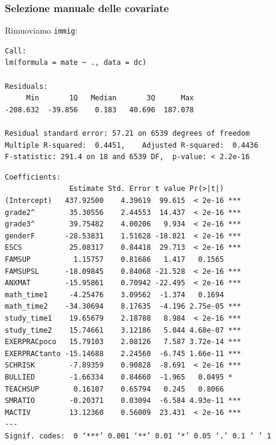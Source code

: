 \documentclass{beamer}
\begin{document}


\begin{frame}[fragile]

\frametitle{Selezione manuale delle covariate}
Rimuoviamo \texttt{immig}:
{\scriptsize
\begin{verbatim}
Call:
lm(formula = mate ~ ., data = dc)

Residuals:
     Min       1Q   Median       3Q      Max 
-208.632  -39.856    0.183   40.696  187.078 

Residual standard error: 57.21 on 6539 degrees of freedom
Multiple R-squared:  0.4451,	Adjusted R-squared:  0.4436 
F-statistic: 291.4 on 18 and 6539 DF,  p-value: < 2.2e-16
\end{verbatim}
}
\end{frame}

\begin{frame}[fragile]

{\tiny
\begin{verbatim}
Coefficients:
               Estimate Std. Error t value Pr(>|t|)    
(Intercept)   437.92500    4.39619  99.615  < 2e-16 ***
grade2^        35.30556    2.44553  14.437  < 2e-16 ***
grade3^        39.75482    4.00206   9.934  < 2e-16 ***
genderF       -28.53831    1.51628 -18.821  < 2e-16 ***
ESCS           25.08317    0.84418  29.713  < 2e-16 ***
FAMSUP          1.15757    0.81686   1.417   0.1565    
FAMSUPSL      -18.09845    0.84068 -21.528  < 2e-16 ***
ANXMAT        -15.95861    0.70942 -22.495  < 2e-16 ***
math_time1     -4.25476    3.09562  -1.374   0.1694    
math_time2    -34.30694    8.17635  -4.196 2.75e-05 ***
study_time1    19.65679    2.18788   8.984  < 2e-16 ***
study_time2    15.74661    3.12186   5.044 4.68e-07 ***
EXERPRACpoco   15.79103    2.08126   7.587 3.72e-14 ***
EXERPRACtanto -15.14688    2.24560  -6.745 1.66e-11 ***
SCHRISK        -7.89359    0.90828  -8.691  < 2e-16 ***
BULLIED        -1.66334    0.84660  -1.965   0.0495 *  
TEACHSUP        0.16107    0.65794   0.245   0.8066    
SMRATIO        -0.20371    0.03094  -6.584 4.93e-11 ***
MACTIV         13.12360    0.56009  23.431  < 2e-16 ***
---
Signif. codes:  0 ‘***’ 0.001 ‘**’ 0.01 ‘*’ 0.05 ‘.’ 0.1 ‘ ’ 1
\end{verbatim}
}
\end{frame}
\end{document}
